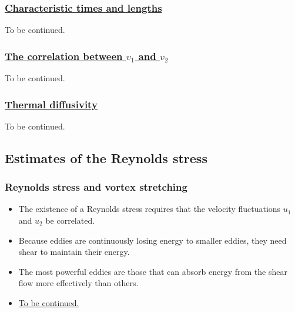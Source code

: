 \documentclass[review]{elsarticle}
\numberwithin{equation}{section}
\begin{document}
	\subsubsection{\underline{Characteristic times and lengths}}
		To be continued.
	\subsubsection{\underline{The correlation between $v_1$ and $v_2$}}
		To be continued.
	\subsubsection{\underline{Thermal diffusivity}}
		To be continued.
	
	\subsection{Estimates of the Reynolds stress}
	\subsubsection{Reynolds stress and vortex stretching}
		\begin{itemize}
			\item The existence of a Reynolds stress requires that the velocity fluctuations $u_1$ and $u_2$ be correlated.
			\item Because eddies are continuously losing energy to smaller eddies, they need shear to maintain their energy.
			\item The most powerful eddies are those that can absorb energy from the shear flow more effectively than others.
			\item \underline{To be continued.}
		\end{itemize}
\end{document}
